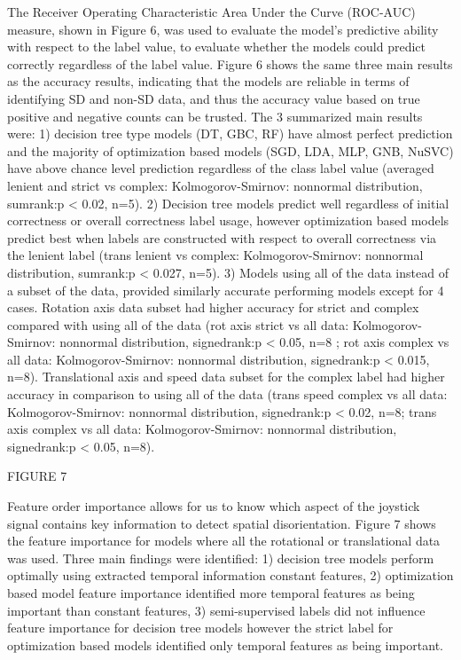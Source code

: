 \documentclass[11pt, onecolumn]{article}
\begin{document}
The Receiver Operating Characteristic Area Under the Curve (ROC-AUC) measure, shown in Figure 6, was used to evaluate the model's predictive ability with respect to the label value, to evaluate whether the models could predict correctly regardless of the label value.  Figure 6 shows the same three main results as the accuracy results, indicating that the models are reliable in terms of identifying SD and non-SD data, and thus the accuracy value based on true positive and negative counts can be trusted.  The 3 summarized main results were: 1) decision tree type models (DT, GBC, RF) have almost perfect prediction and the majority of optimization based models (SGD, LDA, MLP, GNB, NuSVC) have above chance level prediction regardless of the class label value (averaged lenient and strict vs complex:  Kolmogorov-Smirnov: nonnormal distribution, sumrank:p < 0.02, n=5). 2) Decision tree models predict well regardless of initial correctness or overall correctness label usage, however optimization based models predict best when labels are constructed with respect to overall correctness via the lenient label (trans lenient vs complex: Kolmogorov-Smirnov: nonnormal distribution, sumrank:p < 0.027, n=5). 
3) Models using all of the data instead of a subset of the data, provided similarly accurate performing models except for 4 cases.  Rotation axis data subset had higher accuracy for strict and complex compared with using all of the data (rot axis strict vs all data: Kolmogorov-Smirnov: nonnormal distribution, signedrank:p < 0.05, n=8 ; rot axis complex vs all data: Kolmogorov-Smirnov: nonnormal distribution, signedrank:p < 0.015, n=8).  Translational axis and speed data subset for the complex label had higher accuracy in comparison to using all of the data  (trans speed complex vs all data: Kolmogorov-Smirnov: nonnormal distribution, signedrank:p < 0.02, n=8; trans axis complex vs all data: Kolmogorov-Smirnov: nonnormal distribution, signedrank:p < 0.05, n=8).

FIGURE 7

Feature order importance allows for us to know which aspect of the joystick signal contains key information to detect spatial disorientation.  Figure 7 shows the feature importance for models where all the rotational or translational data was used.  Three main findings were identified: 1) decision tree models perform optimally using extracted temporal information constant features, 2) optimization based model feature importance identified more temporal features as being important than constant features, 3) semi-supervised labels did not influence feature importance for decision tree models however the strict label for optimization based models identified only temporal features as being important.
\end{document}

